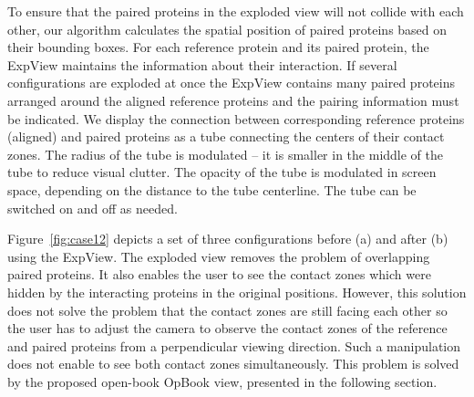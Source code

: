 \documentclass{bmcart}
\begin{document}
To ensure that the paired proteins in the exploded view will not collide with each other, our algorithm calculates the spatial position of paired proteins based on their bounding boxes.
For each reference protein and its paired protein, the ExpView maintains the information about their interaction.
If several configurations are exploded at once the ExpView contains many paired proteins arranged around the aligned reference proteins and the pairing information must be indicated.
We display the connection between corresponding reference proteins (aligned) and paired proteins as a tube connecting the centers of their contact zones.
The radius of the tube is modulated -- it is smaller in the middle of the tube to reduce visual clutter.
The opacity of the tube is modulated in screen space, depending on the distance to the tube centerline.
The tube can be switched on and off as needed.

Figure~\ref{fig:case12} depicts a set of three configurations before (a) and after (b) using the ExpView.
The exploded view removes the problem of overlapping paired proteins.
It also enables the user to see the contact zones which were hidden by the interacting proteins in the original positions.
However, this solution does not solve the problem that the contact zones are still facing each other so the user has to adjust the camera to observe the contact zones of the reference and paired proteins from a perpendicular viewing direction. 
Such a manipulation does not enable to see both contact zones simultaneously.
This problem is solved by the proposed open-book OpBook view, presented in the following section.
\end{document}
